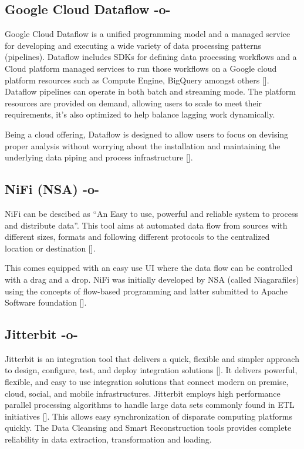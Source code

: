 \subsection{Google Cloud Dataflow -o-}
    
Google Cloud Dataflow is a unified programming model and a managed
service for developing and executing a wide variety of data processing
patterns (pipelines). Dataflow includes SDKs for defining data
processing workflows and a Cloud platform managed services to run
those workflows on a Google cloud platform resources such as Compute
Engine, BigQuery amongst others [\cite{www-Dataflow}]. Dataflow
pipelines can operate in both batch and streaming mode. The platform
resources are provided on demand, allowing users to scale to meet
their requirements, it's also optimized to help balance lagging work
dynamically.

Being a cloud offering, Dataflow is designed to allow users to focus
on devising proper analysis without worrying about the installation
and maintaining the underlying data piping and process
infrastructure [\cite{www-GoogleLiveStream}].


    
\subsection{NiFi (NSA) -o-}

NiFi can be descibed as ``An Easy to use, powerful and reliable system
to process and distribute data''\cite{www-nifi}.  This tool aims at
automated data flow from sources with different sizes, formats and
following different protocols to the centralized location or
destination [\cite{www-hortanworks}].
    
This comes equipped with an easy use UI where the data flow can be
controlled with a drag and a drop.  NiFi was initially developed by
NSA (called Niagarafiles) using the concepts of flow-based programming
and latter submitted to Apache Software foundation [\cite{www-forbes}].

\subsection{Jitterbit -o-}

Jitterbit is an integration tool that delivers a quick, flexible and
simpler approach to design, configure, test, and deploy integration
solutions [\cite{datasheet}].  It delivers powerful, flexible, and easy
to use integration solutions that connect modern on premise, cloud,
social, and mobile infrastructures. Jitterbit employs high performance
parallel processing algorithms to handle large data sets commonly
found in ETL initiatives [\cite{www-jitetl}]. This allows easy
synchronization of disparate computing platforms quickly. The Data
Cleansing and Smart Reconstruction tools provides complete reliability
in data extraction, transformation and loading.

